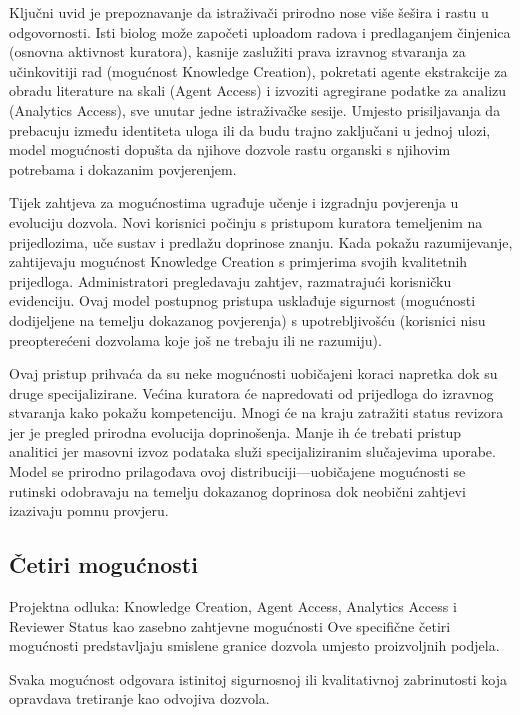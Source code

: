 \documentclass[12pt,a4paper]{article}
\begin{document}
Ključni uvid je prepoznavanje da istraživači prirodno nose više šešira i rastu u odgovornosti. Isti biolog može započeti uploadom radova i predlaganjem činjenica (osnovna aktivnost kuratora), kasnije zaslužiti prava izravnog stvaranja za učinkovitiji rad (mogućnost Knowledge Creation), pokretati agente ekstrakcije za obradu literature na skali (Agent Access) i izvoziti agregirane podatke za analizu (Analytics Access), sve unutar jedne istraživačke sesije. Umjesto prisiljavanja da prebacuju između identiteta uloga ili da budu trajno zaključani u jednoj ulozi, model mogućnosti dopušta da njihove dozvole rastu organski s njihovim potrebama i dokazanim povjerenjem.

Tijek zahtjeva za mogućnostima ugrađuje učenje i izgradnju povjerenja u evoluciju dozvola. Novi korisnici počinju s pristupom kuratora temeljenim na prijedlozima, uče sustav i predlažu doprinose znanju. Kada pokažu razumijevanje, zahtijevaju mogućnost Knowledge Creation s primjerima svojih kvalitetnih prijedloga. Administratori pregledavaju zahtjev, razmatrajući korisničku evidenciju. Ovaj model postupnog pristupa usklađuje sigurnost (mogućnosti dodijeljene na temelju dokazanog povjerenja) s upotrebljivošću (korisnici nisu preopterećeni dozvolama koje još ne trebaju ili ne razumiju).

Ovaj pristup prihvaća da su neke mogućnosti uobičajeni koraci napretka dok su druge specijalizirane. Većina kuratora će napredovati od prijedloga do izravnog stvaranja kako pokažu kompetenciju. Mnogi će na kraju zatražiti status revizora jer je pregled prirodna evolucija doprinošenja. Manje ih će trebati pristup analitici jer masovni izvoz podataka služi specijaliziranim slučajevima uporabe. Model se prirodno prilagođava ovoj distribuciji—uobičajene mogućnosti se rutinski odobravaju na temelju dokazanog doprinosa dok neobični zahtjevi izazivaju pomnu provjeru.

\subsection{Četiri mogućnosti}

\begin{rationale}{Projektna odluka: Knowledge Creation, Agent Access, Analytics Access i Reviewer Status kao zasebno zahtjevne mogućnosti}
Ove specifične četiri mogućnosti predstavljaju smislene granice dozvola umjesto proizvoljnih podjela.
\end{rationale}

Svaka mogućnost odgovara istinitoj sigurnosnoj ili kvalitativnoj zabrinutosti koja opravdava tretiranje kao odvojiva dozvola.
\end{document}
